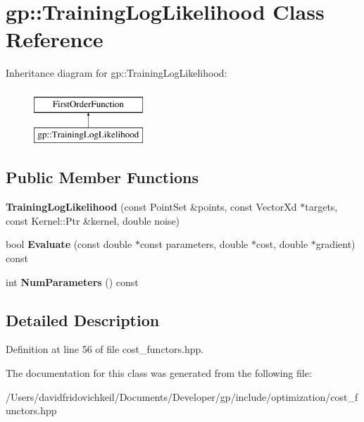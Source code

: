 \hypertarget{classgp_1_1_training_log_likelihood}{}\section{gp\+:\+:Training\+Log\+Likelihood Class Reference}
\label{classgp_1_1_training_log_likelihood}
Inheritance diagram for gp\+:\+:Training\+Log\+Likelihood\+:\begin{figure}[H]
\begin{center}
\leavevmode
\includegraphics[height=2.000000cm]{classgp_1_1_training_log_likelihood}
\end{center}
\end{figure}
\subsection*{Public Member Functions}
\begin{DoxyCompactItemize}
\item 
\hypertarget{classgp_1_1_training_log_likelihood_a8b5d7ce6c0cb0b705cf08d063935cf2a}{}\label{classgp_1_1_training_log_likelihood_a8b5d7ce6c0cb0b705cf08d063935cf2a} 
{\bfseries Training\+Log\+Likelihood} (const Point\+Set \&points, const Vector\+Xd $\ast$targets, const Kernel\+::\+Ptr \&kernel, double noise)
\item 
\hypertarget{classgp_1_1_training_log_likelihood_a436617b7f5e4d393e1f65fc4a77c66dd}{}\label{classgp_1_1_training_log_likelihood_a436617b7f5e4d393e1f65fc4a77c66dd} 
bool {\bfseries Evaluate} (const double $\ast$const parameters, double $\ast$cost, double $\ast$gradient) const
\item 
\hypertarget{classgp_1_1_training_log_likelihood_a6a1682cbb9f44981acb7dfedc4729ffa}{}\label{classgp_1_1_training_log_likelihood_a6a1682cbb9f44981acb7dfedc4729ffa} 
int {\bfseries Num\+Parameters} () const
\end{DoxyCompactItemize}


\subsection{Detailed Description}


Definition at line 56 of file cost\+\_\+functors.\+hpp.



The documentation for this class was generated from the following file\+:\begin{DoxyCompactItemize}
\item 
/\+Users/davidfridovichkeil/\+Documents/\+Developer/gp/include/optimization/cost\+\_\+functors.\+hpp\end{DoxyCompactItemize}
